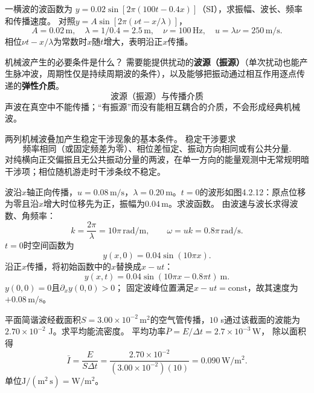 \problemtext 一横波的波函数为
$y=0.02\sin[2\pi(100t-0.4x)]$（SI），求振幅、波长、频率和传播速度。
\workings
对照$y=A\sin[2\pi(\nu t-x/\lambda)]$，
\[
\boxed{A=0.02\,\mathrm m},\quad
\boxed{\lambda=1/0.4=2.5\,\mathrm m},\quad
\boxed{\nu=100\,\mathrm{Hz}},\quad
\boxed{u=\lambda\nu=250\,\mathrm{m/s}}.
\]
\crosscheck 相位$\nu t-x/\lambda$为常数时$x$随$t$增大，表明沿正$x$传播。

\problemtext 机械波产生的必要条件是什么？
\workings
需要能提供扰动的\textbf{波源（振源）}（单次扰动也能产生脉冲波，周期性仅是持续周期波的条件），以及能够把振动通过相互作用逐点传递的\textbf{弹性介质}。
\[
\boxed{\text{波源（振源）与传播介质}}
\]
\crosscheck 声波在真空中不能传播；“有振源”而没有能相互耦合的介质，不会形成经典机械波。

\problemtext 两列机械波叠加产生稳定干涉现象的基本条件。
\workings
稳定干涉要求
\[
\boxed{\text{频率相同（或固定频差为零）、相位差恒定、振动方向相同或有公共分量}}.
\]
\crosscheck 对纯横向正交偏振且无公共振动分量的两波，在单一方向的能量观测中无常规明暗干涉项；相位随机游走时干涉条纹不稳定。

\problemtext 波沿$x$轴正向传播，$u=0.08\,\mathrm{m/s}$，$\lambda=0.20\,\mathrm m$。$t=0$的波形如图4.2.12：原点位移为零且沿$x$增大时位移先为正，振幅为$0.04\,\mathrm m$。求波函数。
\workings
由波速与波长求得波数、角频率：
\[
k=\frac{2\pi}{\lambda}=10\pi\,\mathrm{rad/m},
\qquad
\omega=uk=0.8\pi\,\mathrm{rad/s}.
\]
$t=0$时空间函数为
\[
y(x,0)=0.04\sin(10\pi x).
\]
沿正$x$传播，将初始函数中的$x$替换成$x-ut$：
\[
\boxed{y(x,t)=0.04\sin(10\pi x-0.8\pi t)\ \mathrm m}.
\]
\crosscheck $y(0,0)=0$且$\partial_x y(0,0)>0$；
固定波峰位置满足$x-ut=\mathrm{const}$，故其速度为$+0.08\,\mathrm{m/s}$。

\problemtext 平面简谐波经截面积$S=3.00\times10^{-2}\,\mathrm{m^2}$的空气管传播，$10$ s通过该截面的波能为$2.70\times10^{-2}$ J。求平均能流密度。
\workings
平均功率$\bar P=E/\Delta t=2.7\times10^{-3}\,\mathrm W$，
除以面积得
\[
\boxed{\bar I=\frac{E}{S\Delta t}
=\frac{2.70\times10^{-2}}{(3.00\times10^{-2})(10)}
=0.090\,\mathrm{W/m^2}}.
\]
\crosscheck 单位$\mathrm J/(\mathrm{m^2\,s})=\mathrm{W/m^2}$。

